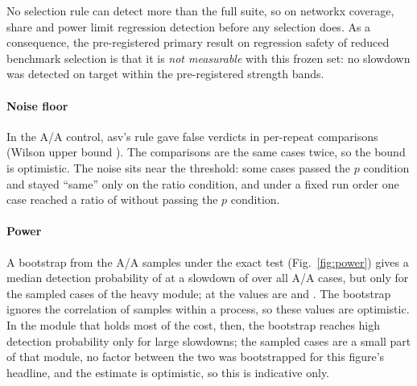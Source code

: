 No selection rule can detect more than the full suite, so on networkx coverage, share and power limit regression detection before any selection does.
As a consequence, the pre-registered primary result on regression safety of reduced benchmark selection is that it is \emph{not measurable} with this frozen set: no slowdown was detected on target within the pre-registered strength bands.

\paragraph*{Noise floor}
In the A/A control, asv's rule gave \AAFalse{} false verdicts in \AAComparisons{} per-repeat comparisons (Wilson upper bound \AAUpper\pct).
The \AAComparisons{} comparisons are the same \AACases{} cases twice, so the bound is optimistic.
The noise sits near the threshold: some cases passed the $p$ condition and stayed ``same'' only on the ratio condition, and under a fixed run order one case reached a ratio of \AAMaxSameRatio{} without passing the $p$ condition.

\paragraph*{Power}
A bootstrap from the A/A samples under the exact test (Fig.~\ref{fig:power}) gives a median detection probability of \PowAllOneTwo{} at a slowdown of \PowFactorMid\x{} over all A/A cases, but only \PowAlgoOneTwo{} for the \AAAlgoCases{} sampled cases of the heavy module; at \PowFactorHigh\x{} the values are \PowAllTwo{} and \PowAlgoTwo.
The bootstrap ignores the correlation of samples within a process, so these values are optimistic.
In the module that holds most of the cost, then, the bootstrap reaches high detection probability only for large slowdowns; the \AAAlgoCases{} sampled cases are a small part of that module, no factor between the two was bootstrapped for this figure's headline, and the estimate is optimistic, so this is indicative only.

